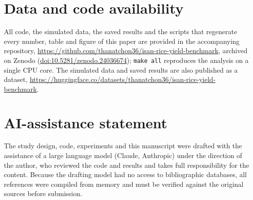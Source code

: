 \documentclass[10pt]{article}
\begin{document}
\section*{Data and code availability}
All code, the simulated data, the saved results and the scripts that regenerate every number, table and figure of this paper are provided in the accompanying repository, \url{https://github.com/thanatchon36/isan-rice-yield-benchmark}, archived on Zenodo (\href{https://doi.org/10.5281/zenodo.24036674}{doi:10.5281/zenodo.24036674}); \texttt{make all} reproduces the analysis on a single CPU core. The simulated data and saved results are also published as a dataset, \url{https://huggingface.co/datasets/thanatchon36/isan-rice-yield-benchmark}.

\section*{AI-assistance statement}
The study design, code, experiments and this manuscript were drafted with the assistance of a large language model (Claude, Anthropic) under the direction of the author, who reviewed the code and results and takes full responsibility for the content. Because the drafting model had no access to bibliographic databases, all references were compiled from memory and must be verified against the original sources before submission.




\appendix
{}

\end{document}
